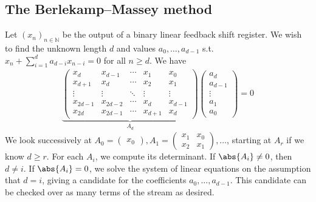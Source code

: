 \subsection{The Berlekamp--Massey method}
Let $(x_n)_{n \in \mathbb N}$ be the output of a binary linear feedback shift register.
We wish to find the unknown length $d$ and values $a_0, \dots, a_{d-1}$ s.t. $x_n + \sum_{i=1}^d a_{d-i} x_{n-i} = 0$ for all $n \geq d$.
We have
\begin{align*}
    \underbrace{\begin{pmatrix}
        x_d & x_{d-1} & \cdots & x_1 & x_0 \\
        x_{d+1} & x_d & \cdots & x_2 & x_1 \\
        \vdots & \vdots & \ddots & \vdots & \vdots \\
        x_{2d-1} & x_{2d-2} & \cdots & x_d & x_{d-1} \\
        x_{2d} & x_{2d-1} & \cdots & x_{d+1} & x_d
    \end{pmatrix}}_{A_d} \begin{pmatrix}
        a_d \\
        a_{d-1} \\
        \vdots \\
        a_1 \\
        a_0
    \end{pmatrix} = 0
\end{align*}
We look successively at $A_0 = \begin{pmatrix}
    x_0
\end{pmatrix}, A_1 = \begin{pmatrix}
    x_1 & x_0 \\
    x_2 & x_1
\end{pmatrix}, \dots$, starting at $A_r$ if we know $d \geq r$.
For each $A_i$, we compute its determinant.
If $\abs{A_i} \neq 0$, then $d \neq i$.
If $\abs{A_i} = 0$, we solve the system of linear equations on the assumption that $d = i$, giving a candidate for the coefficients $a_0, \dots, a_{d-1}$.
This candidate can be checked over as many terms of the stream as desired.
